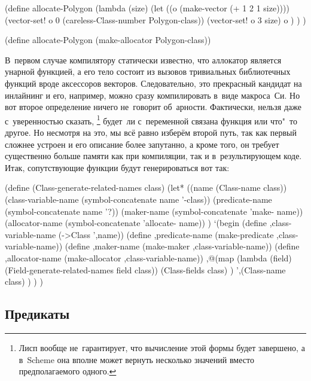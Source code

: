 \begin{code:lisp}
(define allocate-Polygon
        (lambda (size)
          (let ((o (make-vector (+ 1 2 1 size))))
            (vector-set! o 0 (careless-Class-number Polygon-class))
            (vector-set! o 3 size)
            o ) ) )

(define allocate-Polygon (make-allocator Polygon-class))
\end{code:lisp}

В~первом случае компилятору статически известно, что аллокатор является унарной
функцией, а его тело состоит из вызовов тривиальных библиотечных функций вроде
аксессоров векторов. Следовательно, это прекрасный кандидат на инлайнинг и его,
например, можно сразу компилировать в~виде макроса~Си. Но вот второе определение
ничего не~говорит об~арности. Фактически, нельзя даже с~уверенностью сказать,%
\footnote*{Лисп вообще не~гарантирует, что вычисление этой формы будет
завершено, а в~Scheme она вполне может вернуть несколько значений вместо
предполагаемого одного.} будет~ли с~переменной  связана
функция или что"~то другое. Но несмотря на это, мы всё равно изберём второй
путь, так как первый сложнее устроен и его описание более запутанно, а кроме
того, он требует существенно больше памяти как при компиляции, так и
в~результирующем коде. Итак, сопутствующие функции будут генерироваться вот так:

\begin{code:lisp}
(define (Class-generate-related-names class)
  (let* ((name (Class-name class))
         (class-variable-name (symbol-concatenate name '-class))
         (predicate-name      (symbol-concatenate name '?))
         (maker-name          (symbol-concatenate 'make- name))
         (allocator-name      (symbol-concatenate 'allocate- name)) )
   `(begin
      (define ,class-variable-name (->Class ',name))
      (define ,predicate-name (make-predicate ,class-variable-name))
      (define ,maker-name     (make-maker     ,class-variable-name))
      (define ,allocator-name (make-allocator ,class-variable-name))
      ,@(map (lambda (field) (Field-generate-related-names field class))
             (Class-fields class) )
      ',(Class-name class) ) ) )
\end{code:lisp}


\subsection{Предикаты}\label{objects/accomp/ssect:pred}

